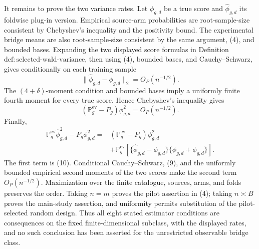 It remains to prove the two variance rates.  Let \(\phi_{g,d}\) be a true score and \(\widehat\phi_{g,d}\) its foldwise plug-in version.  Empirical source-arm probabilities are root-sample-size consistent by Chebyshev's inequality and the positivity bound.  The experimental bridge means are also root-sample-size consistent by the same argument, (4), and bounded bases.  Expanding the two displayed score formulas in Definition~\(\mathrm{def{:}selected\text{-}wald\text{-}variance}\), then using (4), bounded bases, and Cauchy--Schwarz, gives conditionally on each training sample
\[
 \|\widehat\phi_{g,d}-\phi_{g,d}\|_2=O_P(n^{-1/2}).          \tag{9}
\]
The \((4+\delta)\)-moment condition and bounded bases imply a uniformly finite fourth moment for every true score.  Hence Chebyshev's inequality gives
\[
 (\mathbb P_{g}^{\mathrm{ev}}-P_g)\phi_{g,d}^2
 =O_P(n^{-1/2}).                                             \tag{10}
\]
Finally,
\[
\begin{aligned}
 \mathbb P_g^{\mathrm{ev}}\widehat\phi_{g,d}^2-P_g\phi_{g,d}^2
 ={}&(\mathbb P_g^{\mathrm{ev}}-P_g)\phi_{g,d}^2\\
 &+\mathbb P_g^{\mathrm{ev}}
 [\{\widehat\phi_{g,d}-\phi_{g,d}\}
  \{\widehat\phi_{g,d}+\phi_{g,d}\}].                    \tag{11}
\end{aligned}
\]
The first term is (10).  Conditional Cauchy--Schwarz, (9), and the uniformly bounded empirical second moments of the two scores make the second term \(O_P(n^{-1/2})\).  Maximization over the finite catalogue, sources, arms, and folds preserves the order.  Taking \(n=m\) proves the pilot assertion in (4); taking \(n\asymp B\) proves the main-study assertion, and uniformity permits substitution of the pilot-selected random design.  Thus all eight stated estimator conditions are consequences on the fixed finite-dimensional subclass, with the displayed rates, and no such conclusion has been asserted for the unrestricted observable bridge class.